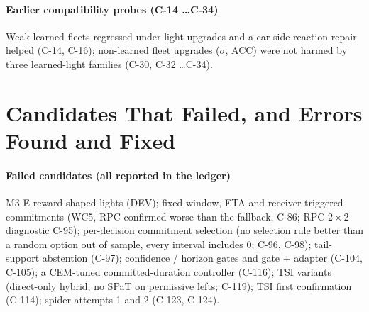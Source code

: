 \paragraph{Earlier compatibility probes (C-14 \dots C-34)} Weak learned fleets regressed under light upgrades and a car-side reaction repair
helped (C-14, C-16); non-learned fleet upgrades ($\sigma$, ACC) were not harmed by three learned-light families (C-30, C-32 \dots C-34).

\section{Candidates That Failed, and Errors Found and Fixed}\label{app:errors}
\paragraph{Failed candidates (all reported in the ledger)} M3-E reward-shaped lights (DEV); fixed-window, ETA and receiver-triggered
commitments (WC5, RPC confirmed worse than the fallback, C-86; RPC $2\times2$ diagnostic C-95); per-decision commitment selection (no
selection rule better than a random option out of sample, every interval includes 0; C-96, C-98); tail-support abstention (C-97);
confidence / horizon gates and gate + adapter (C-104, C-105); a CEM-tuned
committed-duration controller (C-116); TSI variants (direct-only hybrid, no SPaT on permissive lefts; C-119); TSI first confirmation
(C-114); spider attempts 1 and 2 (C-123, C-124).
